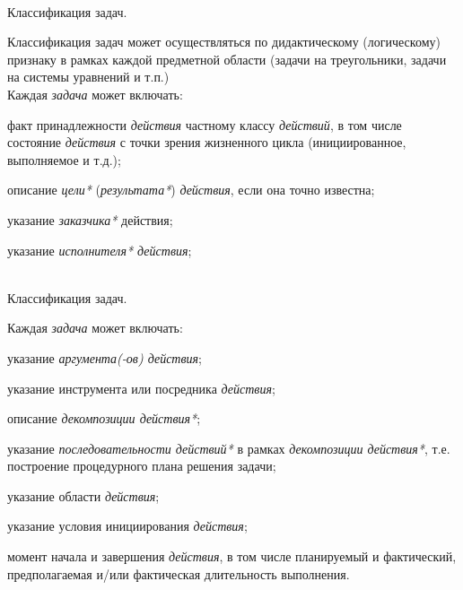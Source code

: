 \begin{frame}{\\Классификация задач.}
	\topline
	\justifying
 
    Классификация задач может осуществляться по дидактическому (логическому) признаку в рамках каждой предметной области (задачи на треугольники, задачи на системы уравнений и т.п.)\\
    \vspace{0.33cm}
    Каждая \textit{задача} может включать:
    \begin{textitemize}
        \item факт принадлежности \textit{действия} частному классу \textit{действий}, в том числе состояние \textit{действия} с точки зрения жизненного цикла (инициированное, выполняемое и т.д.);
        \item описание \textit{цели*} (\textit{результата*}) \textit{действия}, если она точно известна;
        \item указание \textit{заказчика*} действия;
        \item указание \textit{исполнителя* действия};
    \end{textitemize}
\end{frame}

\begin{frame}{\\Классификация задач.}
	\topline
	\justifying
    
    \vspace{0.33cm}
    Каждая \textit{задача} может включать:
    \begin{textitemize}
        \item указание \textit{аргумента(-ов) действия\scnrolesign};
        \item указание инструмента или посредника \textit{действия};
        \item описание \textit{декомпозиции действия*};
        \item указание \textit{последовательности действий*} в рамках \textit{декомпозиции действия*}, т.е. построение процедурного плана решения задачи;
        \item указание области \textit{действия};
        \item указание условия инициирования \textit{действия};
        \item момент начала и завершения \textit{действия}, в том числе планируемый и фактический, предполагаемая и/или фактическая длительность выполнения.
    \end{textitemize}
\end{frame}

